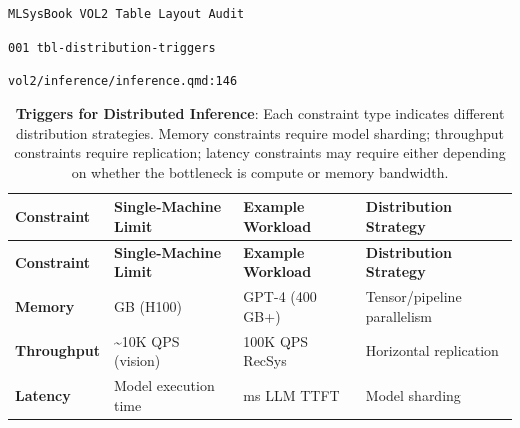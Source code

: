 \documentclass[
  twoside]{scrbook}
\author{}
\date{}
\makeatletter
\let\originalfrontmatter\frontmatter
\renewcommand{\frontmatter}{%
  \clearpage%
  \originalfrontmatter%
}
\let\originalmainmatter\mainmatter
\renewcommand{\mainmatter}{%
  \clearpage%
  \originalmainmatter%
}
\newif\ifmlsys@inside@longtable
\newif\ifmlsys@longtable@numbered
\let\mlsys@orig@label\label
\renewcommand{\label}[1]{%
  \ifmlsys@inside@longtable
    \global\mlsys@longtable@numberedtrue
  \fi
  \mlsys@orig@label{#1}%
}
\makeatother
\begin{document}
\frontmatter


\mainmatter
\pagestyle{empty}

\texttt{MLSysBook\ VOL2\ Table\ Layout\ Audit}

\texttt{001\ tbl-distribution-triggers}

\texttt{vol2/inference/inference.qmd:146}

\begin{longtable}[]{@{}
  >{\raggedright\arraybackslash}p{}
  >{\centering\arraybackslash}p{}
  >{\centering\arraybackslash}p{}
  >{\centering\arraybackslash}p{}@{}}
\caption{\textbf{Triggers for Distributed Inference}: Each constraint
type indicates different distribution strategies. Memory constraints
require model sharding; throughput constraints require replication;
latency constraints may require either depending on whether the
bottleneck is compute or memory
bandwidth.}\label{tbl-distribution-triggers}\tabularnewline
\toprule\noalign{}
\begin{minipage}[b]{\linewidth}\raggedright
\textbf{Constraint}
\end{minipage} & \begin{minipage}[b]{\linewidth}\centering
\textbf{Single-Machine Limit}
\end{minipage} & \begin{minipage}[b]{\linewidth}\centering
\textbf{Example Workload}
\end{minipage} & \begin{minipage}[b]{\linewidth}\centering
\textbf{Distribution Strategy}
\end{minipage} \\
\midrule\noalign{}
\endfirsthead
\toprule\noalign{}
\begin{minipage}[b]{\linewidth}\raggedright
\textbf{Constraint}
\end{minipage} & \begin{minipage}[b]{\linewidth}\centering
\textbf{Single-Machine Limit}
\end{minipage} & \begin{minipage}[b]{\linewidth}\centering
\textbf{Example Workload}
\end{minipage} & \begin{minipage}[b]{\linewidth}\centering
\textbf{Distribution Strategy}
\end{minipage} \\
\midrule\noalign{}
\endhead
\bottomrule\noalign{}
\endlastfoot
\textbf{Memory} & 80 GB (H100) & GPT-4 (400 GB+) & Tensor/pipeline
parallelism \\
\textbf{Throughput}\index{Distributed Inference!throughput constraint} &
\textasciitilde10K QPS (vision) & 100K QPS RecSys & Horizontal
replication \\
\textbf{Latency}\index{Distributed Inference!latency constraint} & Model
execution time & 500 ms LLM TTFT & Model sharding \\
\end{longtable}
\end{document}
